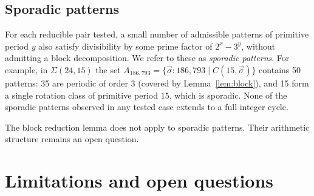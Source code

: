 \documentclass[11pt,a4paper]{article}
\theoremstyle{plain}
\theoremstyle{definition}
\begin{document}
\subsection{Sporadic patterns}\label{sec:sporadic}

For each reducible pair tested, a small number of admissible patterns of
primitive period $y$ also satisfy divisibility by some prime factor of
$2^x - 3^y$, without admitting a block decomposition. We refer to these as
\emph{sporadic patterns}. For example, in $\Sigma(24, 15)$ the set
$A_{186{,}793} = \{\vec\sigma : 186{,}793 \mid C(15, \vec\sigma)\}$ contains
50 patterns: 35 are periodic of order $3$ (covered by
Lemma~\ref{lem:block}), and 15 form a single rotation class of primitive
period $15$, which is sporadic. None of the sporadic patterns observed in
any tested case extends to a full integer cycle.

The block reduction lemma does not apply to sporadic patterns. Their
arithmetic structure remains an open question.


\section{Limitations and open questions}
\end{document}
